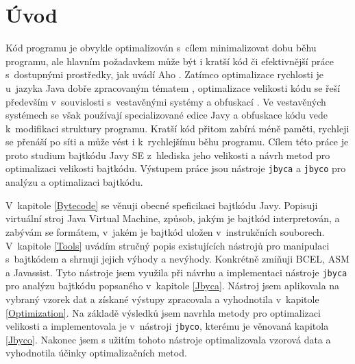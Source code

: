 \chapter{Úvod}\label{Introduction}


Kód programu je obvykle optimalizován s~cílem minimalizovat dobu běhu programu, ale hlavním požadavkem může být i kratší kód či efektivnější práce s~dostupnými prostředky, jak uvádí Aho \cite{}. Zatímco optimalizace rychlosti je u~jazyka Java dobře zpracovaným tématem \cite{}, optimalizace velikosti kódu se řeší především v~souvislosti s~vestavěnými systémy \cite{} a obfuskací \cite{}. Ve vestavěných systémech se však používají specializované edice Javy a obfuskace kódu vede k~modifikaci struktury programu. Kratší kód přitom zabírá méně paměti, rychleji se přenáší po síti a může vést i k~rychlejšímu běhu programu. Cílem této práce je proto studium bajtkódu Javy SE z~hlediska jeho velikosti a návrh metod pro optimalizaci velikosti bajtkódu. Výstupem práce jsou nástroje \texttt{jbyca} a \texttt{jbyco} pro analýzu a optimalizaci bajtkódu.

V~kapitole \ref{Bytecode} se věnuji obecné speficikaci bajtkódu Javy. Popisuji virtuální stroj Java Virtual Machine, způsob, jakým je bajtkód interpretován, a zabývám se formátem, v~jakém je bajtkód uložen v~instrukčních souborech. V~kapitole \ref{Tools} uvádím stručný popis existujících nástrojů pro manipulaci s~bajtkódem a shrnuji jejich výhody a nevýhody. Konkrétně zmiňuji BCEL, ASM a Javassist. Tyto nástroje jsem využila při návrhu a implementaci nástroje \texttt{jbyca} pro analýzu bajtkódu popsaného v~kapitole \ref{Jbyca}. Nástroj jsem aplikovala na vybraný vzorek dat a získané výstupy zpracovala a vyhodnotila v~kapitole \ref{Optimization}. Na základě výsledků jsem navrhla metody pro optimalizaci velikosti a implementovala je v~nástroji \texttt{jbyco}, kterému je věnovaná kapitola \ref{Jbyco}. Nakonec jsem s užitím tohoto nástroje optimalizovala vzorová data a vyhodnotila účinky optimalizačních metod.



